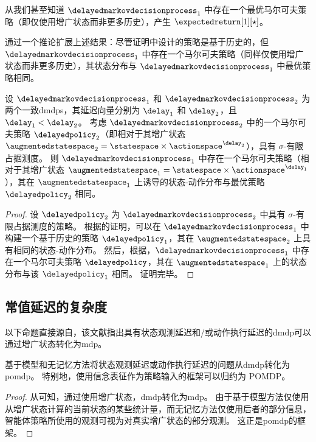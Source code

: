 \begin{remark}
    从\cite[Theorem~6.2.10 and Theorem~8.1.2]{puterman1994markov}我们甚至知道 $\delayedmarkovdecisionprocess_{1}$ 中存在一个最优马尔可夫策略（即仅使用增广状态而非更多历史），产生 $\expectedreturn[1][\star]$。
\end{remark}

通过一个推论扩展上述结果：尽管证明中设计的策略是基于历史的，但 $\delayedmarkovdecisionprocess_{1}$ 中存在一个马尔可夫策略（同样仅使用增广状态而非更多历史），其状态分布与 $\delayedmarkovdecisionprocess_{1}$ 中最优策略相同。

\begin{prop}
\label{corol:markov_optimal_delayed_equiv}
    设 $\delayedmarkovdecisionprocess_{1}$ 和 $\delayedmarkovdecisionprocess_{2}$ 为两个一致\glspl{dmdp}，其延迟向量分别为 $\delay_1$ 和 $\delay_2$，且 $\delay_1<\delay_2$。
    考虑 $\delayedmarkovdecisionprocess_{2}$ 中的一个马尔可夫策略 $\delayedpolicy_2$（即相对于其增广状态 $\augmentedstatespace_2=\statespace\times\actionspace^{\delay_2}$），具有 $\sigma$-有限占据测度。
    则 $\delayedmarkovdecisionprocess_{1}$ 中存在一个马尔可夫策略（相对于其增广状态 $\augmentedstatespace_1=\statespace\times\actionspace^{\delay_1}$），其在 $\augmentedstatespace_1$ 上诱导的状态-动作分布与最优策略 $\delayedpolicy_2$ 相同。
\end{prop}
\begin{proof}
    设 $\delayedpolicy_2$ 为 $\delayedmarkovdecisionprocess_{2}$ 中具有 $\sigma$-有限占据测度的策略。
    根据的证明，可以在 $\delayedmarkovdecisionprocess_{1}$ 中构建一个基于历史的策略 $\delayedpolicy_1$，其在 $\augmentedstatespace_2$ 上具有相同的状态-动作分布。
    然后，根据\cite[Theorem~3]{laroche2022non}，$\delayedmarkovdecisionprocess_{1}$ 中存在一个马尔可夫策略 $\delayedpolicy$，其在 $\augmentedstatespace_1$ 上的状态分布与该 $\delayedpolicy_1$ 相同。
    证明完毕。
\end{proof}

\subsection{常值延迟的复杂度}
\label{subsec:delay_complexity}

以下命题直接源自\cite{bertsekas1987dynamic,altman1992closed}，该文献指出具有状态观测延迟和/或动作执行延迟的\gls{dmdp}可以通过增广状态转化为\gls{mdp}。
\begin{prop}
\label{pp:dmdp_pompd}
基于模型和无记忆方法将状态观测延迟或动作执行延迟的问题从\gls{dmdp}转化为\gls{pomdp}。
特别地，使用信念表征作为策略输入的框架可以归约为 POMDP。
\end{prop}
\begin{proof}
    从\cite{bertsekas1987dynamic,altman1992closed}可知，通过使用增广状态，\gls{dmdp}转化为\gls{mdp}。
    由于基于模型方法仅使用从增广状态计算的当前状态的某些统计量，而无记忆方法仅使用后者的部分信息，智能体策略所使用的观测可视为对真实增广状态的部分观测。
    这正是\gls{pomdp}的框架。
\end{proof}

